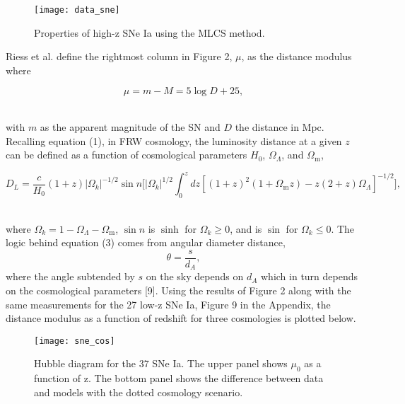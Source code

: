 \documentclass[12pt]{article}
\begin{document}
\begin{figure}[h]
    \centering
    \texttt{[image: data\_sne]}
    \caption{Properties of high-z SNe Ia using the MLCS method.}
    \label{fig:mesh1}
\end{figure}

Riess et al. define the rightmost column in Figure 2, $\mu$, as the distance modulus where

\begin{equation}
\mu = m-M = 5\log D + 25,
\end{equation}
\

with $m$ as the apparent magnitude of the SN and $D$ the distance in Mpc. Recalling equation (1), in FRW cosmology, the luminosity distance at a given $z$ can be defined as a function of cosmological parameters $H_0$, $\Omega_\Lambda$, and $\Omega_\text{m}$, 

\begin{equation}
D_L = \frac{c}{H_0}(1+z)|\Omega_k|^{-1/2} \sin n\bigg[|\Omega_k|^{1/2} \int_{0}^z dz[(1+z)^2 (1+\Omega_\text{m}z)-z(2+z)\Omega_\Lambda]^{-1/2} \bigg],
\end{equation}
\

\noindent where $\Omega_k = 1- \Omega_\Lambda - \Omega_\text{m}$, $\sin n$ is $\sinh$ for $\Omega_k \geq 0$, and is $\sin$ for $\Omega_k \leq 0$. The logic behind equation (3) comes from angular diameter distance, 
\begin{equation}
\theta=\frac{s}{d_A },
\end{equation}
\noindent where the angle subtended by $s$ on the sky depends on $d_A$ which in turn depends on the cosmological parameters [9]. Using the results of Figure 2 along with the same measurements for the 27 low-z SNe Ia, Figure 9 in the Appendix, the distance modulus as a function of redshift for three cosmologies is plotted below. 
\begin{figure}[h]
    \centering
    \texttt{[image: sne\_cos]}
    \caption{Hubble diagram for the 37 SNe Ia. The upper panel shows $\mu_0$ as a function of z. The bottom panel shows the difference between data and models with the dotted cosmology scenario. }
    \label{fig:mesh1}
\end{figure}
\end{document}

